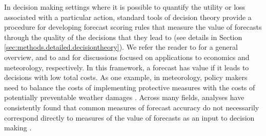 \documentclass{article}\usepackage[]{graphicx}\usepackage[]{xcolor}
\begin{document}
In decision making settings where it is possible to quantify the utility or loss associated with a particular action, standard tools of decision theory provide a procedure for developing forecast scoring rules that measure the value of forecasts through the quality of the decisions that they lead to (see details in Section \ref{sec:methods.detailed.decisiontheory}).
We refer the reader to \cite{yardley2021utility_cost_forecasts} for a general overview, and to \cite{pesaran2002decision_based_eval} and \cite{murphy1993whatisagoodforecast} for discussions focused on applications to economics and meteorology, respectively.
In this framework, a forecast has value if it leads to decisions with low total costs.
As one example,
in meteorology, policy makers need to balance the costs of implementing protective measures with the costs of potentially preventable weather damages \citep{palmer2002economic, pappenberger2015monetarybenefitfloodwarnings}.
Across many fields, analyses have consistently found that common measures of forecast accuracy do not necessarily correspond directly to measures of the value of forecasts as an input to decision making \cite[e.g.,][]{leitch1991economicForecastEval, murphy1993whatisagoodforecast, cenesizoglu2012returnPredictionEconValue}.
\end{document}
